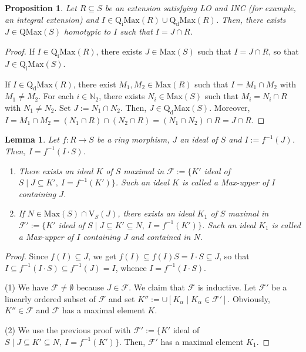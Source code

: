 \documentclass[12pt,leqno]{amsart}
\newtheorem{lemma}[theorem]{Lemma}
\newtheorem{proposition}[theorem]{Proposition}
\theoremstyle{definition}
\begin{document}
\begin{proposition}\label{3.4} Let $R\subseteq S$ be an extension satisfying LO and INC (for example, an integral extension) and $I\in\mathrm{Q_iMax}(R)\cup\mathrm{Q_dMax}(R)$. Then, there exists $J\in\mathrm{QMax}(S)$ homotypic to $I$  such that $I=J\cap R$. 
\end{proposition}
\begin{proof} If $I\in\mathrm{Q_iMax}(R)$, there exists $J\in\mathrm{Max}(S)$ such that $I=J\cap R$, so that $J\in\mathrm{Q_iMax}(S)$.  

If $I\in\mathrm{Q_dMax}(R)$, there exist $M_1,M_2\in\mathrm{Max}(R)$ such that $I=M_1\cap M_2$ with $M_1\neq M_2$. For each $i\in\mathbb N _2$, there exists $N_i\in\mathrm{Max}(S)$ such that $M_i=N_i\cap R$ with $N_1\neq N_2$. Set $J:=N_1\cap N_2$. Then, $J\in\mathrm {Q_dMax}(S)$. Moreover, $I=M_1\cap M_2=(N_1\cap R)\cap (N_2\cap R)=(N_1\cap N_2)\cap R=J\cap R$.
\end{proof}

\begin{lemma}\label{3.53} Let $f:R\to S$ be a ring morphism, $J$ an ideal of $S$ and $I:=f^{-1}(J)$. Then, $I=f^{-1}(I\cdot S)$.
 \begin{enumerate}
\item There exists an ideal $K$ of $S$ maximal in $\mathcal F:=\{K'$ ideal of $S\mid J\subseteq K',\ I=f^{-1}(K')\}$. Such an ideal $K$ is called a Max-upper of $I$ containing $J$.
\item If $N\in\mathrm{Max}(S)\cap\mathrm{V}_S(J)$, there exists an ideal $K_1$ of $S$ maximal in $\mathcal F':=\{K'$ ideal of $S\mid J\subseteq K' \subseteq N,\ I=f^{-1}(K')\}$. Such an ideal $K_1$ is called a Max-upper of $I$ containing $J$ and contained in $N$.
\end{enumerate}
 \end{lemma}
\begin{proof} Since $f(I)\subseteq J$, we get $f(I)\subseteq f(I)S=I\cdot S\subseteq J$, so that $I\subseteq f^{-1}(I\cdot S)\subseteq f^{-1}(J)=I$, whence $I=f^{-1}(I\cdot S)$. 

(1) We have $\mathcal F\neq\emptyset$ because $J\in\mathcal F$. We claim that $\mathcal F$ is inductive. Let $\mathcal F'$ be a linearly ordered subset of $\mathcal F$ and set $K'':=\cup[K_{\alpha}\mid K_{\alpha}\in\mathcal F']$. Obviously, $K''\in\mathcal F$ and $\mathcal F$ has a maximal element $K$. 

(2) We use the previous proof with $\mathcal F':=\{K'$ ideal of $S\mid J\subseteq K'\subseteq N,\ I=f^{-1}(K')\}$. Then, $\mathcal F'$ has a maximal element $K_1$. 
\end{proof}
\end{document}
